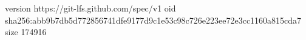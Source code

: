 version https://git-lfs.github.com/spec/v1
oid sha256:abb9b7db5d772856741dfe9177d9c1e53c98c726e223ee72e3cc1160a815cda7
size 174916
